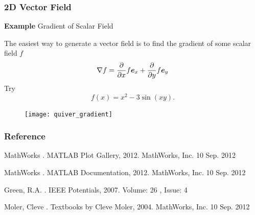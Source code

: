 \documentclass{beamer}  %
\begin{document}
\begin{frame}[fragile]
\frametitle{2D Vector Field}
\textbf{Example} Gradient of Scalar Field

The easiest way to generate a vector field is to find the gradient of some scalar field $f$
\begin{equation}
    \nabla f = \frac{\partial}{\partial x} f \boldsymbol{e}_x + \frac{\partial}{\partial y} f \boldsymbol{e}_y 
\end{equation}
\pause
Try
\begin{equation}
    f(x) = x^2 - 3\sin(xy).
\end{equation}

\begin{figure}
    \centering
    \texttt{[image: quiver\_gradient]}
\end{figure}

\end{frame}
\begin{frame}[allowframebreaks]
\frametitle{Reference}
  \begin{thebibliography}{10}    
    MathWorks
    .
    \newblock MATLAB Plot Gallery, 2012. MathWorks, Inc. 10 Sep. 2012
  \end{thebibliography}

  \begin{thebibliography}{10}    
    MathWorks
    .
    \newblock MATLAB Documentation, 2012. MathWorks, Inc. 10 Sep. 2012
  \end{thebibliography}

  \begin{thebibliography}{10}    
    Green, R.A. 
    .
    \newblock IEEE Potentials, 2007. Volume: 26 , Issue: 4 
  \end{thebibliography}
  
  \begin{thebibliography}{10}    
    Moler, Cleve
    .
    \newblock Textbooks by Cleve Moler, 2004. MathWorks, Inc. 10 Sep. 2012
  \end{thebibliography}
  
\end{frame}
\end{document}
